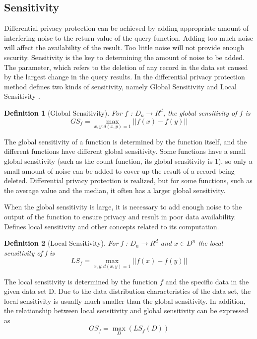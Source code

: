 \documentclass[10pt,conference]{IEEEtran}
\newtheorem{definition}{Definition}
\begin{document}
\subsection{Sensitivity}

Differential privacy protection can be achieved by adding appropriate amount of interfering noise to the return value of the query function. Adding too much noise will affect the availability of the result. Too little noise will not provide enough security. Sensitivity is the key to determining the amount of noise to be added. The parameter, which refers to the deletion of any record in the data set caused by the largest change in the query results. In the differential privacy protection method defines two kinds of sensitivity, namely Global Sensitivity and Local Sensitivity .

\begin{definition}
[Global Sensitivity\cite{Nissim2007Smooth}] For $f$ : $D_{n}\rightarrow R^{d}$, the global sensitivity of $f$ is
\begin{equation}
G{S_f} = \mathop {\max }\limits_{x,y:d(x,y)=1}||f(x)-f(y)||
\end{equation}
\end{definition}

The global sensitivity of a function is determined by the function itself, and the different functions have different global sensitivity. Some functions have a small global sensitivity (such as the count function, its global sensitivity is 1), so only a small amount of noise can be added to cover up the result of a record being deleted. Differential privacy protection is realized, but for some functions, such as the average value and the median, it often has a larger global sensitivity.

When the global sensitivity is large, it is necessary to add enough noise to the output of the function to ensure privacy and result in poor data availability. Defines local sensitivity and other concepts related to its computation.

\begin{definition}
[Local Sensitivity\cite{Nissim2007Smooth}]For f : $D_{n}\rightarrow R^{d}$ and $x\in D^{n}$ the local sensitivity of f is
\begin{equation}
L{S_f} = \mathop {\max }\limits_{x,y:d(x,y)=1}||f(x)-f(y)||
\end{equation}
\end{definition}


The local sensitivity is determined by the function $f$ and the specific data in the given data set D. Due to the data distribution characteristics of the data set, the local sensitivity is usually much smaller than the global sensitivity. In addition, the relationship between local sensitivity and global sensitivity can be expressed as
\begin{equation}
G{S_f} = \mathop {\max }\limits_D (L{S_f}(D))
\end{equation}
\end{document}
